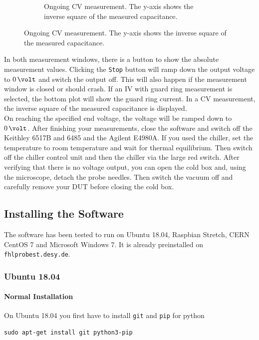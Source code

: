 \documentclass[a4paper]{article}
\begin{document}
\begin{figure}[hbtp]
\begin{subfigure}[t]{0.475\textwidth}
\caption[Running CV Measurement]{Ongoing CV measurement. The y-axis shows the inverse square of the measured capacitance.}
\label{fig:cvmeas}
\end{subfigure}
\end{figure}

In both measurement windows, there is a button to show the absolute measurement values.
Clicking the {\tt Stop} button will ramp down the output voltage to $0\,\volt$ and switch the output off.
This will also happen if the measurement window is closed or should crash.
If an IV with guard ring measurement is selected, the bottom plot will show the guard ring current.
In a CV measurement, the inverse square of the measured capacitance is displayed.\\

On reaching the specified end voltage, the voltage will be ramped down to $0\,\volt$.
After finishing your measurements, close the software and switch off the Keithley 6517B and 6485 and the Agilent E4980A.
If you used the chiller, set the temperature to room temperature and wait for thermal equilibrium.
Then switch off the chiller control unit and then the chiller via the large red switch.
After verifying that there is no voltage output, you can open the cold box and, using the microscope, detach the probe needles.
Then switch the vacuum off and carefully remove your DUT before closing the cold box.\\

\subsection{Installing the Software}
\label{sec:installation}

The software has been tested to run on Ubuntu 18.04, Raspbian Stretch, CERN CentOS 7 and Microsoft Windows 7.
It is already preinstalled on {\tt fhlprobest.desy.de}.

\subsubsection{Ubuntu 18.04}

\paragraph{Normal Installation\\}
On Ubuntu 18.04 you first have to install {\tt git} and {\tt pip} for python

\medskip
\begin{lstlisting}
sudo apt-get install git python3-pip
\end{lstlisting}
\medskip
\end{document}
